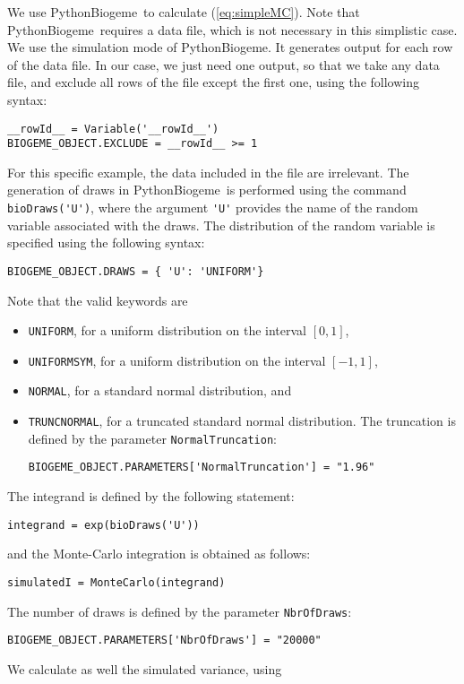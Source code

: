 \documentclass[12pt,a4paper]{article}
\newcommand{\req}[1]{(\ref{#1})}
\newcommand{\PBIOGEME}{PythonBiogeme}
\begin{document}
We use \PBIOGEME\ to calculate \req{eq:simpleMC}. Note that
\PBIOGEME\ requires a data file, which is not necessary in this simplistic
case. We
use the simulation mode of \PBIOGEME. It generates output for each
row of the data file. In our case, we just need one output, so that we
take any data file, and exclude all rows of the file except the first
one, using the following syntax:
\begin{lstlisting}
__rowId__ = Variable('__rowId__')
BIOGEME_OBJECT.EXCLUDE = __rowId__ >= 1
\end{lstlisting}
For this specific example, the data included in the file are
irrelevant. The generation of draws in \PBIOGEME\ is performed using
the command \lstinline$bioDraws('U')$, where the argument
\lstinline$'U'$ provides the name of the random variable associated
with the draws. The distribution of the random variable is specified
using the following syntax: 
\begin{lstlisting}
BIOGEME_OBJECT.DRAWS = { 'U': 'UNIFORM'}
\end{lstlisting}
Note that the valid keywords are 
\begin{itemize}
\item \lstinline$UNIFORM$, for a uniform
distribution on the interval $[0,1]$, 
\item \lstinline$UNIFORMSYM$, for a
uniform distribution on the interval $[-1,1]$, 
\item \lstinline$NORMAL$, for a standard normal distribution, and
\item \lstinline$TRUNCNORMAL$, for a truncated standard normal
  distribution. The truncation is defined by the parameter \lstinline$NormalTruncation$:
\begin{lstlisting}
BIOGEME_OBJECT.PARAMETERS['NormalTruncation'] = "1.96"
\end{lstlisting}
\end{itemize}
The integrand is defined by the following statement:
\begin{lstlisting}
integrand = exp(bioDraws('U'))
\end{lstlisting}
and the Monte-Carlo integration is obtained as follows:
\begin{lstlisting}
simulatedI = MonteCarlo(integrand)
\end{lstlisting}
The number of draws is defined by the parameter \lstinline$NbrOfDraws$:
\begin{lstlisting}
BIOGEME_OBJECT.PARAMETERS['NbrOfDraws'] = "20000"
\end{lstlisting}
We calculate as well the simulated variance, using
\end{document}

